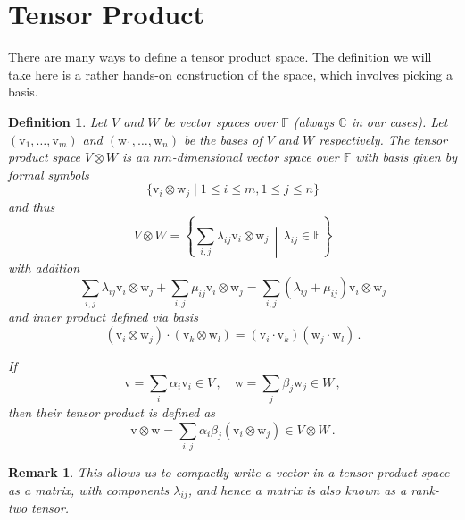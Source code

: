 \documentclass{article}
\theoremstyle{plain}\theoremheaderfont{\normalfont\itshape}\theorembodyfont{\rmfamily}\theoremseparator{.}\newtheorem*{rem}{Remark}\newtheorem*{ex}{Example}\newtheorem*{proof}{Proof}\newtheorem*{altp}{Alternative proof}
\theoremstyle{plain}\theoremheaderfont{\normalfont\bfseries}\theorembodyfont{\rmfamily}\theoremseparator{.}\newtheorem{thm}{Theorem}[section]\newtheorem{lem}[thm]{Lemma}\newtheorem{prop}[thm]{Proposition}\newtheorem*{cor}{Corollary}\newtheorem{defn}[thm]{Definition}\newtheorem{clm}[thm]{Claim}\newtheorem{clminproof}{Claim}\newtheorem*{law}{Law}\newtheorem{pos}[thm]{Postulate}
\theoremstyle{break}\theoremheaderfont{\normalfont\itshape}\theorembodyfont{\rmfamily}\theoremseparator{.\medskip}\newtheorem*{proofskip}{Proof}\newtheorem*{exs}{Examples}\newtheorem*{rems}{Remarks}
\theoremstyle{break}\theoremheaderfont{\normalfont\bfseries}\theorembodyfont{\rmfamily}\theoremseparator{.\medskip}\newtheorem{lemskip}[thm]{Lemma}\newtheorem{defnskip}[thm]{Definition}\newtheorem{propskip}[thm]{Proposition}\newtheorem{thmskip}[thm]{Theorem}
\numberwithin{equation}{section}
\newcommand{\vb}[1]{\bm{\mathrm{#1}}}
\newcommand{\vdot}{\,\bm{\mathrm{\cdot}}\,}
\newcommand{\CC}{\mathbb{C}}
\begin{document}
    \section{Tensor Product}\label{Appendix:Tensor}
    There are many ways to define a tensor product space. The definition we will take here is a rather hands-on construction of the space, which involves picking a basis.
    \begin{defn}
        Let \(V\) and \(W\) be vector spaces over \(\mathbb{F}\) (always \(\CC\) in our cases). Let \((\vb{v}_1,\dots,\vb{v}_m)\) and \((\vb{w}_1,\dots,\vb{w}_n)\) be the bases of \(V\) and \(W\) respectively. The \textit{tensor product space} \(V\otimes W\) is an \(nm\)-dimensional vector space over \(\mathbb{F}\) with basis given by formal symbols
        \begin{equation}
            \{\vb{v}_i\otimes\vb{w}_j\mid 1\le i\le m,1\le j\le n\}
        \end{equation}
        and thus
        \begin{equation}
            V\otimes W=\left\{\sum_{i,j}\lambda_{ij}\vb{v}_i\otimes\vb{w}_j \,\middle|\, \lambda_{ij}\in\mathbb{F}\right\}
        \end{equation}
        with addition
        \begin{equation}
            \sum_{i,j}\lambda_{ij}\vb{v}_i\otimes\vb{w}_j+\sum_{i,j}\mu_{ij}\vb{v}_i\otimes\vb{w}_j=\sum_{i,j}(\lambda_{ij}+\mu_{ij})\vb{v}_i\otimes\vb{w}_j
        \end{equation}
        and inner product defined via basis
        \begin{equation}
           (\vb{v}_i\otimes\vb{w}_j)\vdot(\vb{v}_k\otimes\vb{w}_l)=(\vb{v}_i\vdot\vb{v}_k)(\vb{w}_j\vdot\vb{w}_l)\,.
        \end{equation}

        If
        \begin{equation}
            \vb{v}=\sum_i\alpha_i\vb{v}_i\in V\,,\quad\vb{w}=\sum_j\beta_j\vb{w}_j\in W\,,
        \end{equation}
        then their tensor product is defined as
        \begin{equation}
            \vb{v}\otimes\vb{w}=\sum_{i,j}\alpha_i\beta_j(\vb{v}_i\otimes\vb{w}_j)\in V\otimes W\,.
        \end{equation}
    \end{defn}

    \begin{rem}
        This allows us to compactly write a vector in a tensor product space as a matrix, with components \(\lambda_{ij}\), and hence a matrix is also known as a \textit{rank-two tensor}.
    \end{rem}
\end{document}
